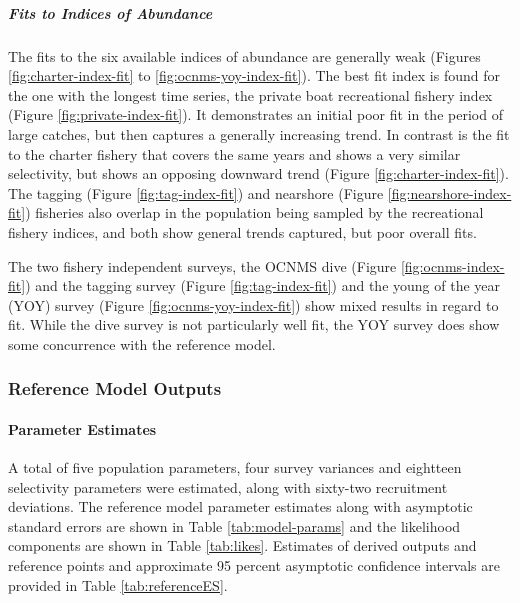 \documentclass[11pt,
  english,
  letterpaper,
]{article}
\begin{document}
\hypertarget{fits-to-indices-of-abundance}{%
\subparagraph{Fits to Indices of Abundance}\label{fits-to-indices-of-abundance}}

The fits to the six available indices of abundance are generally weak (Figures \ref{fig:charter-index-fit} to \ref{fig:ocnms-yoy-index-fit}). The best fit index is found for the one with the longest time series, the private boat recreational fishery index (Figure \ref{fig:private-index-fit}). It demonstrates an initial poor fit in the period of large catches, but then captures a generally increasing trend. In contrast is the fit to the charter fishery that covers the same years and shows a very similar selectivity, but shows an opposing downward trend (Figure \ref{fig:charter-index-fit}). The tagging (Figure \ref{fig:tag-index-fit}) and nearshore (Figure \ref{fig:nearshore-index-fit}) fisheries also overlap in the population being sampled by the recreational fishery indices, and both show general trends captured, but poor overall fits.

The two fishery independent surveys, the OCNMS dive (Figure \ref{fig:ocnms-index-fit}) and the tagging survey (Figure \ref{fig:tag-index-fit}) and the young of the year (YOY) survey (Figure \ref{fig:ocnms-yoy-index-fit}) show mixed results in regard to fit. While the dive survey is not particularly well fit, the YOY survey does show some concurrence with the reference model.

\hypertarget{reference-model-outputs}{%
\subsubsection{Reference Model Outputs}\label{reference-model-outputs}}

\hypertarget{parameter-estimates}{%
\paragraph{Parameter Estimates}\label{parameter-estimates}}

A total of five population parameters, four survey variances and eightteen selectivity parameters were estimated, along with sixty-two recruitment deviations. The reference model parameter estimates along with asymptotic standard errors are shown in Table \ref{tab:model-params} and the likelihood components are shown in Table \ref{tab:likes}. Estimates of derived outputs and reference points and approximate 95 percent asymptotic confidence intervals are provided in Table \ref{tab:referenceES}.
\end{document}
